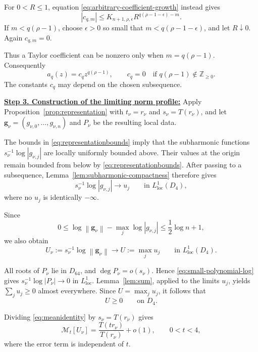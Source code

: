 \documentclass[12pt,letterpaper,reqno]{amsart}
\theoremstyle{definition}
\numberwithin{equation}{section}
\newcommand{\Z}{\mathbb Z}
\newcommand{\loc}{\mathrm{loc}}
\newcommand{\mean}[2]{\mathcal M_{#1}\!\left[#2\right]}
\newcommand{\norm}[1]{\left\lVert#1\right\rVert}
\newcommand{\gv}{\bm g}
\begin{document}
For \(0<R\leq1\), equation
\eqref{eq:arbitrary-coefficient-growth} instead gives
\[
|c_{q,m}|
\leq
K_{{n+1},\rho,\epsilon}
R^{q(\rho-1-\epsilon)-m}.
\]
If \(m<q(\rho-1)\), choose \(\epsilon>0\) so small that
\(m<q(\rho-1-\epsilon)\), and let \(R\downarrow0\). Again
\(c_{q,m}=0\).

Thus a Taylor coefficient can be nonzero only when
\(m=q(\rho-1)\). Consequently
\begin{equation}\label{eq:monomial-coefficients}
 a_q(z)
 =
 c_qz^{q(\rho-1)},
 \qquad
 c_q=0
 \quad\text{if }q(\rho-1)\notin\Z_{\geq0}.
\end{equation}
The constants \(c_q\) may depend on the chosen subsequence.


\medskip\noindent
\textbf{\underline{Step 3. Construction of the limiting norm profile:}}
Apply Proposition~\ref{prop:representation} with
\(t_\nu=r_\nu\) and \(s_\nu=T(r_\nu)\), and let
\(\gv_\nu=(g_{\nu,0},\ldots,g_{\nu,n})\) and \(P_\nu\) be the
resulting local data.

The bounds in \eqref{eq:representationbounds} imply that the
subharmonic functions
\(s_\nu^{-1}\log|g_{\nu,j}|\) are locally uniformly bounded above.
Their values at the origin remain bounded from below by
\eqref{eq:representationbounds}. After passing to a subsequence,
Lemma~\ref{lem:subharmonic-compactness} therefore gives
\[
s_\nu^{-1}\log|g_{\nu,j}|
\longrightarrow u_j
\qquad\text{in }L^1_{\loc}(D_4),
\]
where no \(u_j\) is identically \(-\infty\).

Since
\[
0\leq
\log\norm{\gv_\nu}
-
\max_j\log|g_{\nu,j}|
\leq
\frac12\log {n+1},
\]
we also obtain
\begin{equation}\label{eq:norm-limit}
 U_\nu
 :=
 s_\nu^{-1}\log\norm{\gv_\nu}
 \longrightarrow
 U:=\max_j u_j
 \qquad\text{in }L^1_{\loc}(D_4).
\end{equation}

All roots of \(P_\nu\) lie in \(D_{64}\), and
\(\deg P_\nu=o(s_\nu)\). Hence
\eqref{eq:small-polynomial-log} gives
\(s_\nu^{-1}\log|P_\nu|\to0\) in \(L^1_{\loc}\).
Lemma~\ref{lem:sum}, applied to the limits \(u_j\), yields
\(\sum_j u_j\geq0\) almost everywhere. Since
\(U=\max_j u_j\), it follows that
\begin{equation}\label{eq:U-nonnegative}
 U\geq0
 \qquad\text{on }D_4.
\end{equation}

Dividing \eqref{eq:meanidentity} by \(s_\nu=T(r_\nu)\) gives
\begin{equation}\label{eq:radial-mean}
 \mean t{U_\nu}
 =
 \frac{T(tr_\nu)}{T(r_\nu)}
 +
 o(1),
 \qquad
 0<t<4,
\end{equation}
where the error term is independent of \(t\).
\end{document}

